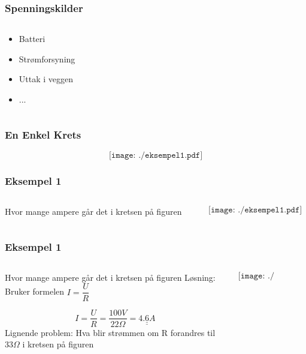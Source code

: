 \documentclass[aspectratio=169,xcolor=dvipsnames]{beamer}
\begin{document}
\begin{frame}
	\frametitle{Spenningskilder}

	\begin{columns}
		\begin{column}{0.5\textwidth}
			\begin{itemize}
				\item Batteri 
				\item Strømforsyning 
				\item Uttak i veggen 
				\item ...
			\end{itemize}
		\end{column}

		\begin{column}{0.5\textwidth}
		\end{column}
	\end{columns}
\end{frame}

\begin{frame}
	\frametitle{En Enkel Krets}

			$$\texttt{[image: ./eksempel1.pdf]}$$
\end{frame}


\begin{frame}
	\frametitle{Eksempel 1}

	\begin{columns}
		\begin{column}{0.5\textwidth}
Hvor mange ampere går det i kretsen på figuren
		\end{column}

		\begin{column}{0.5\textwidth}
			$$\texttt{[image: ./eksempel1.pdf]}$$
		\end{column}
	\end{columns}
\end{frame}

\begin{frame}
	\frametitle{Eksempel 1}

	\begin{columns}
		\begin{column}{0.5\textwidth}
Hvor mange ampere går det i kretsen på figuren
\vskip 1cm
Løsning: Bruker formelen $I=\dfrac{U}{R}$

\[
I=\dfrac{U}{R}=\dfrac{100V}{22\Omega}=\underline{\underline{4.6A}}
\]
\vskip 1cm
Lignende problem: Hva blir strømmen om R forandres til 33$\Omega$
i kretsen på figuren
		\end{column}

		\begin{column}{0.5\textwidth}
			$$\texttt{[image: ./eksempel1.pdf]}$$
		\end{column}
	\end{columns}
\end{frame}
\end{document}
